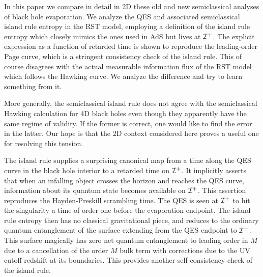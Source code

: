 \documentclass[11pt,oneside,letterpaper]{article}
\def\m{{M}}
\numberwithin{equation}{section}
\begin{document}
In this paper we compare in detail in 2D these old and new  semiclassical analyses of black hole evaporation. We  analyze the QES  and associated semiclassical island rule entropy in the  RST model, employing  a definition of the island rule entropy which closely mimics the ones used in AdS  \cite{Almheiri:2019qdq} but lives at ${\cal I}^+$. 
The  explicit expression as a function of retarded time is shown to  reproduce the leading-order Page curve, which   is a stringent consistency check of the island rule. This of course disagrees with the actual measurable  information flux of the RST model which follows the Hawking curve.   We analyze the difference  and try to learn something from it. 



More generally, the semiclassical island rule  does not agree with the semiclassical  Hawking calculation for 4D black holes even though they apparently have the same regime of validity. If the former is correct, one would like to find the error in the latter.  Our hope is that  the 2D context considered here proves a useful one for resolving this tension. 

The island rule supplies a surprising canonical map from a time along the QES  curve  in the black hole interior to a retarded time on ${\cal I}^+$.  It implicitly  asserts that when an infalling object crosses the horizon and reaches the QES curve, information about its quantum state becomes available on ${\cal I}^+$.  This assertion reproduces the Hayden-Preskill scrambling time. 
The QES is seen at ${\cal I}^+$ to hit the singularity a time of order one before the evaporation endpoint. The island rule entropy then has no classical gravitational piece, and reduces to the ordinary quantum entanglement of the surface extending from the QES endpoint to 
${\cal I}^+$. This surface magically has zero net quantum entanglement to leading order in $\m$ due to a cancellation of the order $\m$ bulk term with corrections due to the UV cutoff redshift at its boundaries. This 
provides another self-consistency check of the island rule. 
\end{document}

